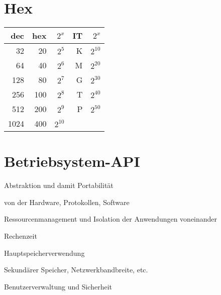 


\newcommand{\SUBJECT}{}
\newcommand{\TITLE}{Cheat Sheet Bsys2}



%


\begin{multicols*}{5}
    \setlength{\columnseprule}{0.4pt}
        \footnotesize

% 

\section{Hex}
\begin{tabular}{r  r  r | r r}
		dec & hex& $2^x$& IT& $2^x$\\
		\hline
			32&20&$2^5$&K&$2^{10}$\\
			64&40&$2^6$&M&$2^{20}$\\
			128&80&$2^7$&G&$2^{30}$\\
			256&100&$2^8$&T&$2^{40}$\\
			512&200&$2^9$&P&$2^{50}$\\
			1024&400&$2^{10}$
		\end{tabular}
		
		\vspace{-1pt}
		
\section{Betriebsystem-API}

    \begin{compactitem}[$\bullet$]
        \item Abstraktion und damit Portabilität
        \begin{compactitem}
            \item von der Hardware, Protokollen, Software
        \end{compactitem}
        \item Ressourcenmanagement und Isolation der Anwendungen voneinander
        \begin{compactitem}
            \item Rechenzeit
            \item Hauptspeicherverwendung
            \item Sekundärer Speicher, Netzwerkbandbreite, etc.
        \end{compactitem}
        \item Benutzerverwaltung und Sicherheit
    \end{compactitem}



\end{multicols*}
